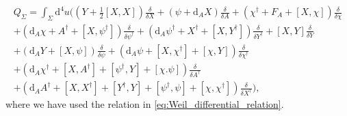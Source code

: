 \documentclass[11pt,colorinlistoftodos]{amsart}
\numberwithin{equation}{subsection}
\theoremstyle{plain}
\theoremstyle{definition}
\theoremstyle{remark}
\newcommand{\dd}{{\mathrm{d}}}
\begin{document}
\begin{multline}
    Q_\Sigma=\int_\Sigma\dd^4u\Bigg(\left(Y+\frac{1}{2}[X,X]\right)\frac{\delta}{\delta X}+(\psi+\dd_AX)\frac{\delta}{\delta A}+(\chi^\dagger+F_A+[X,\chi])\frac{\delta}{\delta \chi}\\
    +(\dd_A\chi+A^\dagger+[X,\psi^\dagger])\frac{\delta}{\delta \psi^\dagger}+(\dd_A\psi^\dagger+X^\dagger+[X,Y^\dagger])\frac{\delta}{\delta Y^\dagger}+[X,Y]\frac{\delta}{\delta Y}\\
    +(\dd_AY+[X,\psi])\frac{\delta}{\delta \psi}+(\dd_A\psi+[X,\chi^\dagger]+[\chi,Y])\frac{\delta}{\delta \chi^\dagger}\\
    +(\dd_A\chi^\dagger+[X,A^\dagger]+[\psi^\dagger,Y]+[\chi.\psi])\frac{\delta}{\delta A^\dagger}\\
    +(\dd_AA^\dagger+[X,X^\dagger]+[Y^\dagger,Y]+[\psi^\dagger,\psi]+[\chi,\chi^\dagger])\frac{\delta}{\delta X^\dagger}\Bigg),
\end{multline}
where we have used the relation in \eqref{eq:Weil_differential_relation}.
\end{document}
